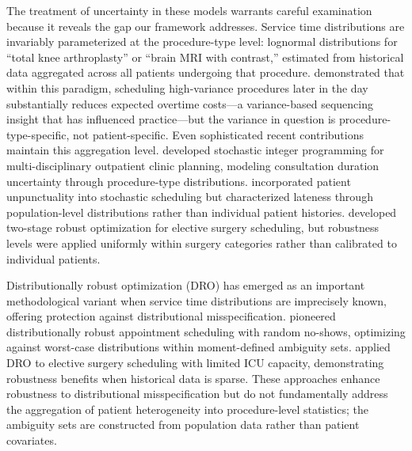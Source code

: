 \documentclass[msom,blindrev]{informs3}
\begin{document}
The treatment of uncertainty in these models warrants careful examination because it reveals the gap our framework addresses. Service time distributions are invariably parameterized at the procedure-type level: lognormal distributions for ``total knee arthroplasty'' or ``brain MRI with contrast,'' estimated from historical data aggregated across all patients undergoing that procedure. \citet{denton2007optimization} demonstrated that within this paradigm, scheduling high-variance procedures later in the day substantially reduces expected overtime costs---a variance-based sequencing insight that has influenced practice---but the variance in question is procedure-type-specific, not patient-specific. Even sophisticated recent contributions maintain this aggregation level. \citet{leeftink2019stochastic} developed stochastic integer programming for multi-disciplinary outpatient clinic planning, modeling consultation duration uncertainty through procedure-type distributions. \citet{jiang2019stochastic} incorporated patient unpunctuality into stochastic scheduling but characterized lateness through population-level distributions rather than individual patient histories. \citet{neyshabouri2017two} developed two-stage robust optimization for elective surgery scheduling, but robustness levels were applied uniformly within surgery categories rather than calibrated to individual patients.

Distributionally robust optimization (DRO) has emerged as an important methodological variant when service time distributions are imprecisely known, offering protection against distributional misspecification. \citet{jiang2017integer} pioneered distributionally robust appointment scheduling with random no-shows, optimizing against worst-case distributions within moment-defined ambiguity sets. \citet{shehadeh2021distributionally} applied DRO to elective surgery scheduling with limited ICU capacity, demonstrating robustness benefits when historical data is sparse. These approaches enhance robustness to distributional misspecification but do not fundamentally address the aggregation of patient heterogeneity into procedure-level statistics; the ambiguity sets are constructed from population data rather than patient covariates.
\end{document}
